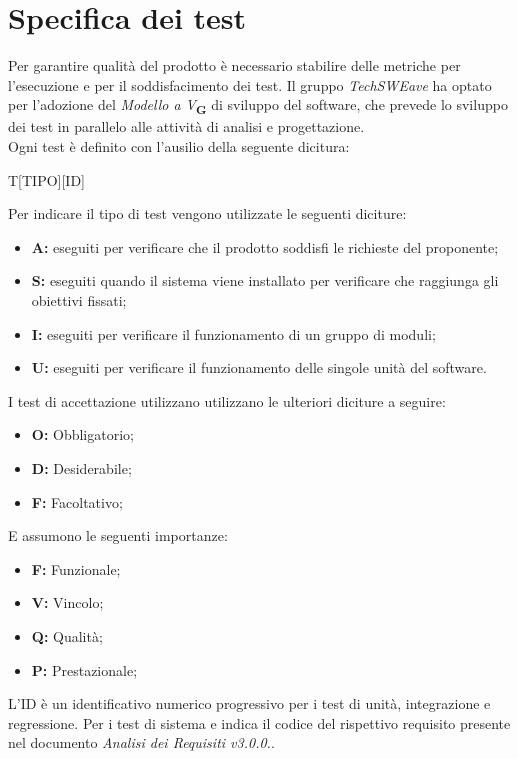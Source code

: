 \section{Specifica dei test}
Per garantire qualità del prodotto è necessario stabilire delle metriche per l’esecuzione e per il soddisfacimento dei test.
Il gruppo \textit{TechSWEave} ha optato per l'adozione del \textit{Modello a V}\textsubscript{\textbf{G}} di sviluppo del software, che
prevede lo sviluppo dei test in parallelo alle attività di analisi e progettazione.\\
Ogni test è definito con l'ausilio della seguente dicitura:\\
\begin{center}
    T[TIPO][ID]
\end{center}
Per indicare il tipo di test vengono utilizzate le seguenti diciture:
\begin{itemize}
    \item \textbf{A:} eseguiti per verificare che il prodotto soddisfi le richieste del proponente;
    \item \textbf{S:} eseguiti quando il sistema viene installato per verificare che raggiunga gli obiettivi fissati;
    \item \textbf{I:} eseguiti per verificare il funzionamento di un gruppo di moduli;
    \item \textbf{U:} eseguiti per verificare il funzionamento delle singole unità del software.
\end{itemize}
I test di accettazione utilizzano utilizzano le ulteriori diciture a seguire:
\begin{itemize}
    \item \textbf{O:} Obbligatorio;
    \item \textbf{D:} Desiderabile;
    \item \textbf{F:} Facoltativo;
\end{itemize}
E assumono le seguenti importanze:
\begin{itemize}
    \item \textbf{F:} Funzionale;
    \item \textbf{V:} Vincolo;
    \item \textbf{Q:} Qualità;
    \item \textbf{P:} Prestazionale;
\end{itemize}
L'ID è un identificativo numerico progressivo per i test di unità, integrazione e regressione. Per i test di sistema e 
indica il codice del rispettivo requisito presente nel documento \textit{Analisi dei Requisiti v3.0.0.}.\\
